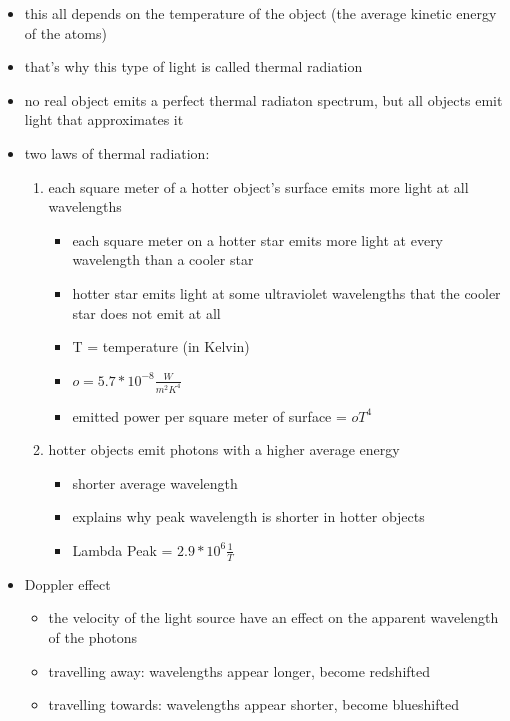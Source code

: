 \documentclass[12pt]{article}
\begin{document}
\begin{itemize}
\item this all depends on the temperature of the object (the average kinetic energy of the atoms)
\item that's why this type of light is called thermal radiation
\item no real object emits a perfect thermal radiaton spectrum, but all objects emit light that approximates it
\end{itemize}

\begin{itemize}
\item two laws of thermal radiation:
\begin{enumerate}
\item each square meter of a hotter object’s surface emits more light at all wavelengths
\begin{itemize}
\item each square meter on a hotter star emits more light at every wavelength than a cooler star
\item hotter star emits light at some ultraviolet wavelengths that the cooler star does not emit at all
\item T = temperature (in Kelvin)
\item $o = 5.7*10^{-8} \frac{W}{m^2 K^4}$
\item emitted power per square meter of surface = $oT^4$
\end{itemize}
\item hotter objects emit photons with a higher average energy
\begin{itemize}
\item shorter average wavelength
\item explains why peak wavelength is shorter in hotter objects
\item Lambda Peak = $2.9*10^6 \frac{1}{T}$
\end{itemize}
\end{enumerate}
\item Doppler effect
\begin{itemize}
\item the velocity of the light source have an effect on the apparent wavelength of the photons
\item travelling away: wavelengths appear longer, become redshifted
\item travelling towards: wavelengths appear shorter, become blueshifted

\end{itemize}
\end{itemize}
\end{document}

